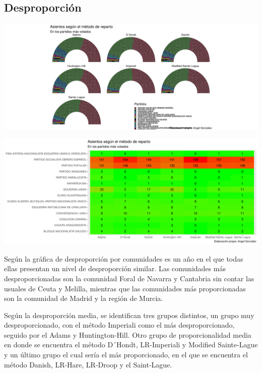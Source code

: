 \documentclass[12pt,a4paper,]{book}
\numberwithin{dummy}{section}
\theoremstyle{ocrenumbox}
\theoremstyle{blacknumex}
\theoremstyle{blacknumbox}
\theoremstyle{ocrenum}
\theoremstyle{ocrenum}
\begin{document}
\hypertarget{desproporciuxf3n-2}{%
\subsection{Desproporción}\label{desproporciuxf3n-2}}

\begin{center}\includegraphics[width=1\linewidth]{figurasR/unnamed-chunk-83-1} \end{center}

\begin{center}\includegraphics[width=1\linewidth]{figurasR/unnamed-chunk-83-2} \end{center}

Según la gráfica de desproporción por comunidades es un año en el que
todas ellas presentan un nivel de desproporción similar. Las comunidades
más desproporcionadas son la comunidad Foral de Navarra y Cantabria sin
contar las usuales de Ceuta y Melilla, mientras que las comunidades más
proporcionadas son la comunidad de Madrid y la región de Murcia.

Según la desproporción media, se identifican tres grupos distintos, un
grupo muy desproporcionado, con el método Imperiali como el más
desproporcionado, seguido por el Adams y Huntington-Hill. Otro grupo de
proporcionalidad media en donde se encuentra el método D´Hondt,
LR-Imperiali y Modified Sainte-Lague y un último grupo el cual sería el
más proporcionado, en el que se encuentra el método Danish, LR-Hare,
LR-Droop y el Saint-Lague.
\end{document}
